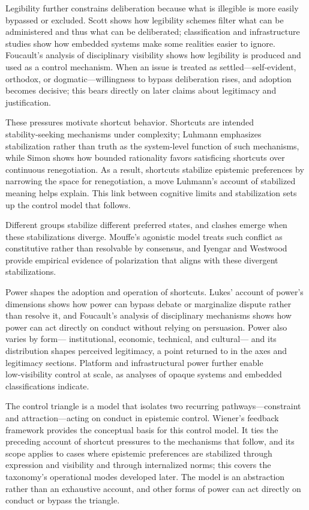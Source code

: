 Legibility further constrains deliberation because what is illegible is more easily bypassed or excluded. Scott shows how legibility schemes filter what can be administered and thus what can be deliberated; classification and infrastructure studies show how embedded systems make some realities easier to ignore.\autocite{scott1998,bowkerstar1999,star1999} Foucault’s analysis of disciplinary visibility shows how legibility is produced and used as a control mechanism.\autocite{foucault1977} When an issue is treated as settled—self‑evident, orthodox, or dogmatic—willingness to bypass deliberation rises, and adoption becomes decisive; this bears directly on later claims about legitimacy and justification.\autocite{foucault1977}

These pressures motivate shortcut behavior. Shortcuts are intended stability‑seeking mechanisms under complexity; Luhmann emphasizes stabilization rather than truth as the system‑level function of such mechanisms, while Simon shows how bounded rationality favors satisficing shortcuts over continuous renegotiation.\autocite{luhmann1995,simon1947} As a result, shortcuts stabilize epistemic preferences by narrowing the space for renegotiation, a move Luhmann’s account of stabilized meaning helps explain.\autocite{luhmann1995} This link between cognitive limits and stabilization sets up the control model that follows.

Different groups stabilize different preferred states, and clashes emerge when these stabilizations diverge. Mouffe’s agonistic model treats such conflict as constitutive rather than resolvable by consensus, and Iyengar and Westwood provide empirical evidence of polarization that aligns with these divergent stabilizations.\autocite{mouffe2000,iyengarwestwood2014}

Power shapes the adoption and operation of shortcuts. Lukes’ account of power’s dimensions shows how power can bypass debate or marginalize dispute rather than resolve it, and Foucault’s analysis of disciplinary mechanisms shows how power can act directly on conduct without relying on persuasion.\autocite{lukes2005,foucault1977} Power also varies by form— institutional, economic, technical, and cultural— and its distribution shapes perceived legitimacy, a point returned to in the axes and legitimacy sections.\autocite{lukes2005} Platform and infrastructural power further enable low‑visibility control at scale, as analyses of opaque systems and embedded classifications indicate.\autocite{pasquale2015,bowkerstar1999,star1999}

The control triangle is a model that isolates two recurring pathways—constraint and attraction—acting on conduct in epistemic control. Wiener’s feedback framework provides the conceptual basis for this control model.\autocite{wiener1948} It ties the preceding account of shortcut pressures to the mechanisms that follow, and its scope applies to cases where epistemic preferences are stabilized through expression and visibility and through internalized norms; this covers the taxonomy’s operational modes developed later. The model is an abstraction rather than an exhaustive account, and other forms of power can act directly on conduct or bypass the triangle.
